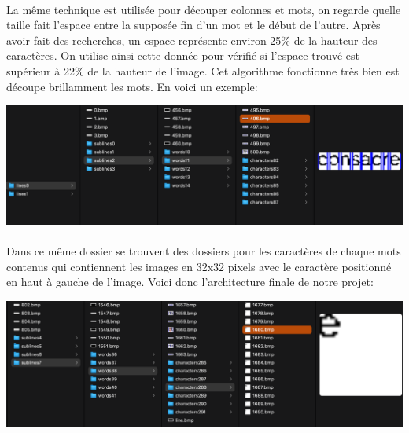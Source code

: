 \documentclass{article}
\begin{document}
	\paragraph{}
	La même technique est utilisée pour découper colonnes et mots, on regarde quelle taille fait l'espace entre la supposée fin d'un mot et le début de l'autre. Après avoir fait des recherches, un espace représente environ 25\% de la hauteur des caractères. On utilise ainsi cette donnée pour vérifié si l'espace trouvé est supérieur à 22\% de la hauteur de l'image. Cet algorithme fonctionne très bien est découpe brillamment les mots. En voici un exemple: \\
	
	\begin{center}
		\includegraphics[scale=0.4]{cutWords.png}
	\end{center}
	
	\paragraph{}Dans ce même dossier se trouvent des dossiers pour les caractères de chaque mots contenus qui contiennent les images en 32x32 pixels avec le caractère positionné en haut à gauche de l'image. Voici donc l'architecture finale de notre projet:
	
	\begin{center}
		\includegraphics[scale=0.35]{cutCharacters.png}
	\end{center}
	
\end{document}
